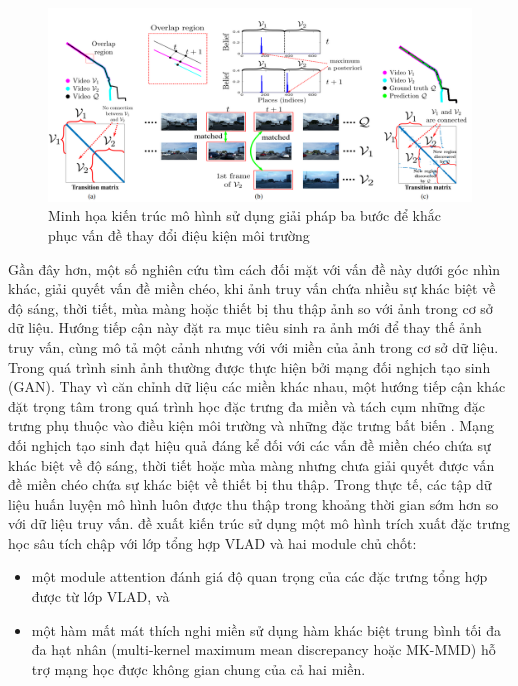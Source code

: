 \begin{figure}[h]
    \centering
    \includegraphics[width=\textwidth]{pics/Chapter2/model3step.png}
    \caption{Minh họa kiến trúc mô hình sử dụng giải pháp ba bước để khắc phục vấn đề thay đổi điệu kiện môi trường \cite{doan2019scalable}}
\end{figure}

Gần đây hơn, một số nghiên cứu tìm cách đối mặt với vấn đề này dưới góc nhìn khác, giải quyết vấn đề miền chéo, khi ảnh truy vấn chứa nhiều sự khác biệt về độ sáng, thời tiết, mùa màng hoặc thiết bị thu thập ảnh so với ảnh trong cơ sở dữ liệu. Hướng tiếp cận này đặt ra mục tiêu sinh ra ảnh mới để thay thế ảnh truy vấn, cùng mô tả một cảnh nhưng với với miền của ảnh trong cơ sở dữ liệu. Trong \cite{Porav2018AdversarialTF, Annosheh2019Night} quá trình sinh ảnh thường được thực hiện bởi mạng đối nghịch tạo sinh (GAN). Thay vì căn chỉnh dữ liệu các miền khác nhau, một hướng tiếp cận khác đặt trọng tâm trong quá trình học đặc trưng đa miền và tách cụm những đặc trưng phụ thuộc vào điều kiện môi trường và những đặc trưng bất biến \cite{yin2019multi}. Mạng đối nghịch tạo sinh đạt hiệu quả đáng kể đối với các vấn đề miền chéo chứa sự khác biệt về độ sáng, thời tiết hoặc mùa màng nhưng chưa giải quyết được vấn đề miền chéo chứa sự khác biệt về thiết bị thu thập. Trong thực tế, các tập dữ liệu huấn luyện mô hình luôn được thu thập trong khoảng thời gian sớm hơn so với dữ liệu truy vấn. \cite{wang2019attention} đề xuất kiến trúc sử dụng một mô hình trích xuất đặc trưng học sâu tích chập với lớp tổng hợp VLAD \cite{jegou2010aggregating} và hai module chủ chốt:

\begin{itemize}
    \item một module attention đánh giá độ quan trọng của các đặc trưng tổng hợp được từ lớp VLAD, và
    \item một hàm mất mát thích nghi miền sử dụng hàm khác biệt trung bình tối đa đa hạt nhân (multi-kernel maximum mean discrepancy hoặc MK-MMD) hỗ trợ mạng học được không gian chung của cả hai miền.
\end{itemize}

